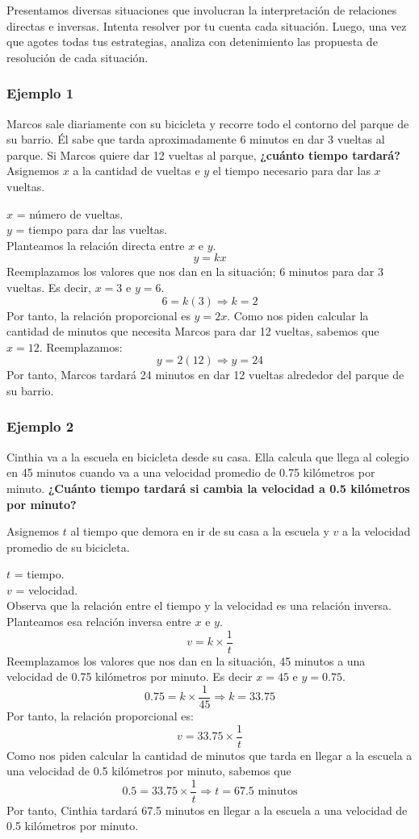 \documentclass[11pt]{book}
\begin{document}
Presentamos diversas situaciones que involucran la interpretación de relaciones directas e inversas.
Intenta resolver por tu cuenta cada situación. Luego, una vez que agotes todas tus estrategias, analiza con detenimiento las propuesta de resolución de cada situación.

\subsubsection{Ejemplo 1}

Marcos sale diariamente con su bicicleta y recorre todo el contorno del parque de su barrio. Él sabe que tarda aproximadamente 6 minutos en dar 3 vueltas al parque.
Si Marcos quiere dar 12 vueltas al parque,
\textbf{¿cuánto tiempo tardará?}\\

Asignemos $x$ a la cantidad de vueltas e $y$ el tiempo necesario para dar las $x$ vueltas.

$x$ = n\'umero de vueltas.\\
$y$ = tiempo para dar las vueltas.\\

Planteamos la relación directa entre $x$ e $y$.
\[y=kx\]
Reemplazamos los valores que nos dan en la situación; 6 minutos para dar 3 vueltas. Es decir, $x=3$ e $y=6$.
\[6=k(3) \Rightarrow k=2\]
Por tanto, la relación proporcional es $y=2x$.
Como nos piden calcular la cantidad de minutos que necesita Marcos para dar 12 vueltas, sabemos que $x=12$.
Reemplazamos:
\[y=2(12) \Rightarrow y=24\]
Por tanto, Marcos tardará 24 minutos en dar 12 vueltas alrededor del parque de su barrio.
\subsubsection{Ejemplo 2}
Cinthia va a la escuela en bicicleta desde su casa. Ella calcula que llega al colegio en 45 minutos cuando va a una velocidad promedio de 0.75 kilómetros por minuto.
\textbf{¿Cuánto tiempo tardará si cambia la velocidad a 0.5 kilómetros por minuto?}

Asignemos $t$ al tiempo que demora en ir de su casa a la escuela y $v$ a la velocidad promedio de su bicicleta.

$t$ = tiempo.\\
$v$ = velocidad.\\

Observa que la relación entre el tiempo y la velocidad es una relación inversa. Planteamos esa relación inversa entre $x$ e $y$.
\[v=k \times \frac{1}{t}\]
Reemplazamos los valores que nos dan en la situación, 45 minutos a una velocidad de 0.75 kilómetros por minuto. Es decir $x=45$ e $y=0.75$.
\[0.75=k\times \frac{1}{45} \Rightarrow k=33.75\]
Por tanto, la relación proporcional es:
\[v=33.75 \times \frac{1}{t}\]
Como nos piden calcular la cantidad de minutos que tarda en llegar a la escuela a una velocidad de 0.5 kilómetros por minuto, sabemos que \[0.5=33.75 \times \frac{1}{t} \Rightarrow t=67.5 \text{ minutos}\]
Por tanto, Cinthia tardará 67.5 minutos en llegar a la escuela a una velocidad de 0.5 kilómetros por minuto.
\end{document}
